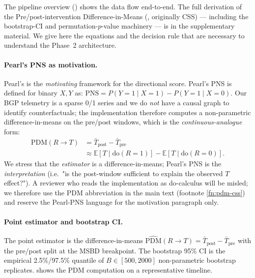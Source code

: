The pipeline overview
() shows the data flow
end-to-end. The full derivation of the Pre/post-intervention
Difference-in-Means (\pdm, originally CSS) --- including
the bootstrap-CI and permutation-$p$-value machinery \cite{efron94} ---
is in the supplementary material. We give here the
equations and the decision rule that are necessary to
understand the Phase~2 architecture.

\paragraph{Pearl's PNS as motivation.}
Pearl's \pns{} \cite{pearl1999, tian-pearl-2000, maley2018, duarte2024} is the
\emph{motivating} framework for the directional score.
Pearl's PNS is defined for binary $X, Y$ as:
$\mathrm{PNS} = P(Y{=}1 \mid X{=}1) - P(Y{=}1 \mid X{=}0)$.
Our BGP telemetry is a sparse 0/1 series and we do
\emph{not} have a causal graph to identify
counterfactuals; the implementation therefore
computes a non-parametric difference-in-means on
the pre/post windows, which is the
\emph{continuous-analogue} form:
\begin{equation}
\begin{aligned}
\mathrm{PDM}(R\!\to\!T) &= \bar{T}_{\mathrm{post}} - \bar{T}_{\mathrm{pre}} \\
&\approx \mathbb{E}[T \mid \mathrm{do}(R{=}1)] - \mathbb{E}[T \mid \mathrm{do}(R{=}0)].
\end{aligned}
\label{eq:css-def}
\end{equation}
We stress that the \emph{estimator} is a
difference-in-means; Pearl's PNS is the
\emph{interpretation} (i.e.\ "is the post-window
sufficient to explain the observed $T$ effect?").
A reviewer who reads the implementation as
do-calculus will be misled; we therefore use the
PDM abbreviation in the main text (footnote
\ref{fn:pdm-css}) and reserve the Pearl-PNS
language for the motivation paragraph only.

\paragraph{Point estimator and bootstrap CI.}
The point estimator is the difference-in-means
$\widehat{\mathrm{PDM}}(R\!\to\!T) = \bar{T}_{\mathrm{post}}
- \bar{T}_{\mathrm{pre}}$ with the pre/post split at the
MSBD breakpoint. The bootstrap 95\% CI is the empirical
2.5\%/97.5\% quantile of $B\in[500,2000]$ non-parametric
bootstrap replicates.  shows
the PDM computation on a representative timeline.

